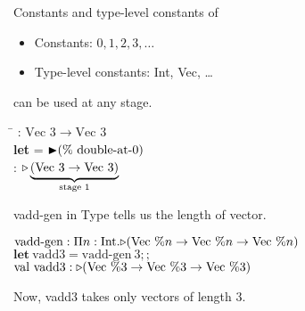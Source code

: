 \documentclass[dvipdfmx,aspectratio=169, 20pt]{beamer}
\begin{document}
\begin{frame}[fragile]{Constants and type-level constants of \LMD}
    \begin{itemize}
        \item Constants: \( 0,1,2,3,\dots \)
        \item Type-level constants: Int, Vec, \dots
    \end{itemize}
    can be used at any stage.
    \begin{exampleblock}{}
        \begin{tabbing}
            \hspace{5mm} \=  : \( \text{Vec }3 \to \text{Vec }3 \) \\[2mm]
            \> \textbf{let }  = \( {\mathop{\blacktriangleright}} (\%\ \text{double-at-0}) \) \\
            \>  : \( {\mathop{\triangleright}} \underbrace{(\text{Vec }3 \to \text{Vec }3)}_{\text{stage 1}} \)
        \end{tabbing}
    \end{exampleblock}
\end{frame}

\begin{frame}[fragile]{vadd-gen in \LMD}
    Type tells us the length of vector.
    \newcommand{\Vn}{\text{Vec}\ \%n}
    \newcommand{\Vt}{\text{Vec}\ \%3}
    \begin{exampleblock}{}
    \begin{tabbing}
        \hspace{5mm} \= \( \text{vadd-gen} : \Pi n:\I. \TW (\Vn \to \Vn \to \Vn) \) \\[2mm]
        \> \( \textbf{let}\ \text{vadd3} = \text{vadd-gen}\ 3;; \) \\
        \> \( \text{val}\ \text{vadd3} : \TW (\Vt \to \Vt \to \Vt) \) \\[2mm]
    \end{tabbing}
    \end{exampleblock}
    Now, vadd3 takes only vectors of length 3.
\end{frame}
\end{document}
